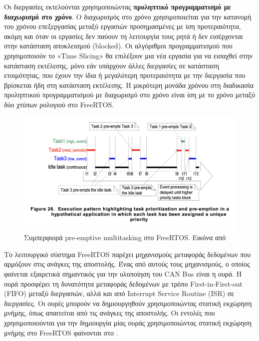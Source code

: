 \documentclass[a4paper,nobib,justified]{tufte-book}
\begin{document}
Οι διεργασίες εκτελούνται χρησιμοποιώντας \textbf{προληπτικό προγραμματισμό με διαχωρισμό στο χρόνο}. Ο διαχωρισμός στο χρόνο χρησιμοποιείται για την κατανομή του χρόνου επεξεργασίας μεταξύ εργασιών προσημασμένες με ίση προτεραιότητα, ακόμη και όταν οι εργασίες δεν παύουν τη λειτουργία τους ρητά ή δεν εισέρχονται στην κατάσταση αποκλεισμού (blocked). Οι αλγόριθμοι προγραμματισμού που χρησιμοποιούν το «Time Slicing» θα επιλέξουν μια νέα εργασία για να εισαχθεί στην κατάσταση εκτέλεσης, μόνο εάν υπάρχουν άλλες διεργασίες σε κατάσταση ετοιμότητας, που έχουν την ίδια ή μεγαλύτερη προτεραιότητα με την διεργασία που βρίσκεται ήδη στη κατάσταση εκτέλεσης. Η μικρότερη μονάδα χρόνου στη διαδικασία προληπτικού προγραμματισμού με διαχωρισμό στο χρόνο είναι ίση με το χρόνο μεταξύ δύο χτύπων ρολογιού στο FreeRTOS.

\begin{figure}[ht]
	\includegraphics[width=1\linewidth]{media/diagrams/freeRTOS-preemptive-multitasking.png}
	\caption[Συμπερφιορά pre-emptive multitasking στο FreeRTOS]{Συμπερφιορά pre-emptive multitasking στο FreeRTOS. Εικόνα από \cite{FreeRTOSManual}}
	\label{fig:freeRTOS-preemptive-multitasking}
\end{figure}

Το λειτουργικό σύστημα FreeRTOS παρέχει μηχανισμούς μεταφοράς δεδομένων που αρμόζουν στις ανάγκες της αποστολής. Ένας από αυτούς τους μηχανισμούς, ο οποίος φαίνεται εξαιρετικά σημαντικός για την υλοποίηση του CAN Bus είναι η ουρά. Η ουρά προσφέρει τη δυνατότητα μεταφοράς δεδομένων με τρόπο First-in-First-out (FIFO) μεταξύ διεργασιών, αλλά και από Interrupt Service Routine (ISR) σε διεργασίες. Οι ουρές μπορούν να δημιουργηθούν χρησιμοποιώντας στατική εκχώρηση μνήμης, όπως απαιτείται από τις ανάγκες της αποστολής. Οι εντολές που χρησιμοποιούνται για την δημιουργία μίας ουράς χρησιμοποιώντας στατική εκχώρηση μνήμης στο FreeRTOS φαίνονται στο .
\end{document}
